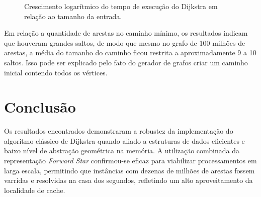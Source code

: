 \documentclass[12pt]{article}
\begin{document}
\begin{figure}[htbp]
    \centering
    \caption{Crescimento logarítmico do tempo de execução do Dijkstra em relação ao tamanho da entrada.}
    \label{fig:line-growth}
\end{figure}

Em relação a quantidade de arestas no caminho mínimo, os resultados indicam que houveram grandes saltos, de modo que mesmo no grafo de 100 milhões de arestas, a média do tamanho do caminho ficou restrita a aproximadamente 9 a 10 saltos. Isso pode ser explicado pelo fato do gerador de grafos criar um caminho inicial contendo todos os vértices.

\section{Conclusão}

Os resultados encontrados demonstraram a robustez da implementação do algoritmo clássico de Dijkstra quando aliado a estruturas de dados eficientes e baixo nível de abstração geométrica na memória. A utilização combinada da representação \textit{Forward Star} confirmou-se eficaz para viabilizar processamentos em larga escala, permitindo que instâncias com dezenas de milhões de arestas fossem varridas e resolvidas na casa dos segundos, refletindo um alto aproveitamento da localidade de cache.
\end{document}
